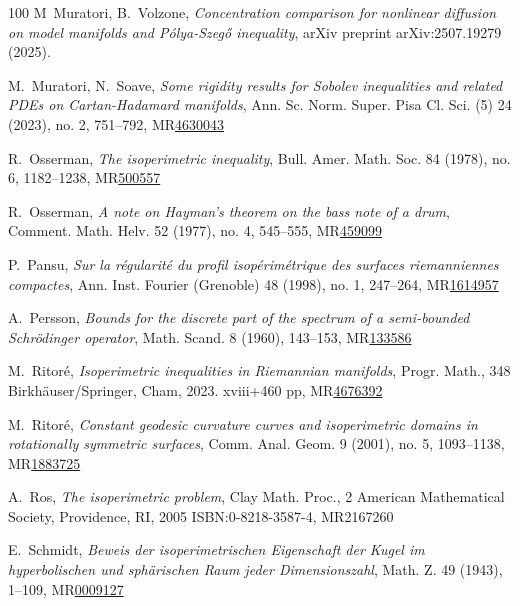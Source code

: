 \documentclass[a4paper,11pt,reqno]{amsart}
\theoremstyle{plain}
\numberwithin{equation}{section} \allowdisplaybreaks
\begin{document}
\begin{thebibliography}{100}
 M~Muratori, B.~Volzone, \emph{Concentration comparison for nonlinear diffusion on model manifolds and P\'olya-Szeg\H {o} inequality}, arXiv preprint arXiv:2507.19279 (2025).

 M.~Muratori, N.~Soave, \emph{Some rigidity results for Sobolev inequalities and related PDEs on Cartan-Hadamard manifolds}, Ann. Sc. Norm. Super. Pisa Cl. Sci. (5) 24 (2023), no. 2, 751–792, MR\href{https://doi.org/10.2422/2036-2145.202105_071}{4630043}

 R.~Osserman, \emph{The isoperimetric inequality}, Bull. Amer. Math. Soc. 84 (1978), no. 6, 1182–1238, MR\href{https://doi.org/10.1090/S0002-9904-1978-14553-4}{500557}



 R.~Osserman, \emph{A note on Hayman's theorem on the bass note of a drum}, Comment. Math. Helv. 52 (1977), no. 4, 545–555, MR\href{https://doi.org/10.1007/BF02567388}{459099}



 P.~Pansu, \emph{Sur la régularité du profil isopérimétrique des surfaces riemanniennes compactes}, Ann. Inst. Fourier (Grenoble) 48 (1998), no. 1, 247–264, MR\href{https://doi.org/10.5802/aif.1617}{1614957}



 A.~Persson, \emph{Bounds for the discrete part of the spectrum of a semi-bounded Schrödinger operator}, Math. Scand. 8 (1960), 143–153, MR\href{https://doi.org/10.7146/math.scand.a-10602}{133586}

 M.~Ritor\'e, \emph{Isoperimetric inequalities in Riemannian manifolds}, Progr. Math., 348
Birkhäuser/Springer, Cham, 2023. xviii+460 pp, MR\href{https://doi.org/10.1007/978-3-031-37901-7}{4676392}

 M.~Ritor\'e, \emph{Constant geodesic curvature curves and isoperimetric domains in rotationally symmetric surfaces}, Comm. Anal. Geom. 9 (2001), no. 5, 1093–1138, MR\href{https://doi.org/10.4310/CAG.2001.v9.n5.a5}{1883725}



 A.~Ros, \emph{The isoperimetric problem}, Clay Math. Proc., 2
American Mathematical Society, Providence, RI, 2005
ISBN:0-8218-3587-4, MR{2167260}

 E.~Schmidt, \emph{Beweis der isoperimetrischen Eigenschaft der Kugel im hyperbolischen und sphärischen Raum jeder Dimensionszahl}, Math. Z. 49 (1943), 1–109, MR\href{https://doi.org/10.1007/BF01174192}{0009127}


\end{thebibliography}
\end{document}
